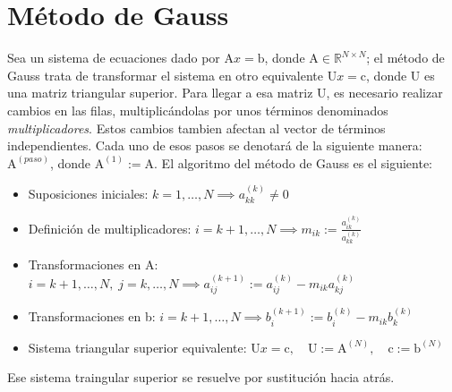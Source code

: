 \documentclass{article}
\begin{document}
\section{Método de Gauss}
Sea un sistema de ecuaciones dado por $\text{A}x=\text{b}$, donde $\text{A}\in\mathbb{R}^{N\times N}$; el método de Gauss trata de transformar el sistema en otro equivalente $\text{U}x=\text{c}$, donde U es una matriz triangular superior. Para llegar a esa matriz U, es necesario realizar cambios en las filas, multiplicándolas por unos términos denominados \emph{multiplicadores}. Estos cambios tambien afectan al vector de términos independientes. Cada uno de esos pasos se denotará de la siguiente manera: $\text{A}^{(paso)}$, donde $\text{A}^{(1)}:=\text{A}$. El algoritmo del método de Gauss es el siguiente:
\begin{itemize}
\item Suposiciones iniciales: $k=1,\dots,N\implies a_{kk}^{(k)}\neq 0$
\item Definición de multiplicadores: $i=k+1,\dots,N\implies m_{ik}:=\displaystyle\frac{a_{ik}^{(k)}}{a_{kk}^{(k)}}$
\item Transformaciones en A: $i=k+1,\dots,N,\;j=k,\dots,N\implies a_{ij}^{(k+1)}:=a_{ij}^{(k)}-m_{ik}a_{kj}^{(k)}$
\item Transformaciones en b: $i=k+1,\dots,N\implies b_i^{(k+1)}:=b_i^{(k)}-m_{ik}b_k^{(k)}$
\item Sistema triangular superior equivalente: $\text{U}x=\text{c},\quad\text{U}:=\text{A}^{(N)},\quad\text{c}:=\text{b}^{(N)}$
\end{itemize}
Ese sistema traingular superior se resuelve por sustitución hacia atrás.

\hrulefill
\end{document}
